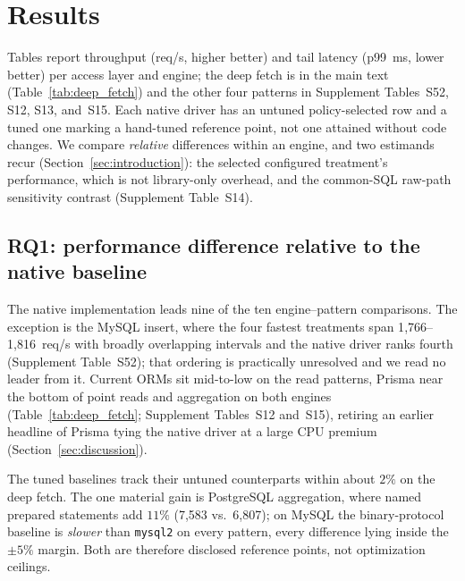 \section{Results}
\label{sec:results}

Tables report throughput (req/s, higher better) and tail latency (p99~ms, lower better) per access
layer and engine; the deep fetch is in the main text (Table~\ref{tab:deep_fetch}) and the other four
patterns in Supplement Tables~S52, S12, S13, and~S15. Each native driver has an untuned
policy-selected row and a tuned one marking a hand-tuned reference point, not one attained without
code changes. We compare \emph{relative} differences within an engine, and two estimands recur
(Section~\ref{sec:introduction}): the selected configured treatment's performance, which is not
library-only overhead, and the common-SQL raw-path sensitivity contrast (Supplement Table~S14).



\subsection{RQ1: performance difference relative to the native baseline}
The native implementation leads nine of the ten engine--pattern comparisons. The exception is the
MySQL insert, where the four fastest treatments span 1{,}766--1{,}816~req/s with broadly overlapping
intervals and the native driver ranks fourth (Supplement Table~S52); that ordering is practically
unresolved and we read no leader from it. Current ORMs sit mid-to-low on the read patterns, Prisma
near the bottom of point reads and aggregation on both engines (Table~\ref{tab:deep_fetch};
Supplement Tables~S12 and~S15), retiring an earlier headline of Prisma tying the native driver at a
large CPU premium (Section~\ref{sec:discussion}).

The tuned baselines track their untuned counterparts within about $2\%$ on the deep fetch. The one
material gain is PostgreSQL aggregation, where named prepared statements add $11\%$ (7{,}583 vs.\
6{,}807); on MySQL the binary-protocol baseline is \emph{slower} than \texttt{mysql2} on every
pattern, every difference lying inside the $\pm5\%$ margin. Both are therefore disclosed reference
points, not optimization ceilings.

